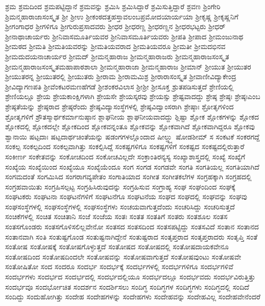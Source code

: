 {ಶ್ರಮ
ಶ್ರಮದಿಂದ
ಶ್ರಮಪಟ್ಟಿದ್ದಾನೆ
ಶ್ರಮವನ್ನು
ಶ್ರಮಿಸಿ
ಶ್ರಮಿಸಿದ್ದಾರೆ
ಶ್ರಮಿಸುತ್ತಿದ್ದಾರೆ
ಶ್ರವಣ
ಶ್ರಿಂಗೇರಿ
ಶ್ರಿಮನ್ಮಹಾರಾಜಾಸಂಸ್ಕೃತ
ಶ್ರೀ
ಶ್ರೀಉ
ಶ್ರೀಕಂಠದತ್ತಹಸ್ತಾವಲಂಬಪ್ರಮೋದಯಾರ್ಯಯಾ
ಶ್ರೀಕೃಷ್ಣ
ಶ್ರೀಕೃಷ್ಣನಿಗೆ
ಶ್ರೀಗಂಗಾಧರ
ಶ್ರೀಗಳಿಗೂ
ಶ್ರೀಗುರುಪ್ರಸಾದವರು
ಶ್ರೀಧರ
ಶ್ರೀಧರಣ್ಣ
ಶ್ರೀಧರಣ್ಣನ
ಶ್ರೀಧರಭಟ್ಟರು
ಶ್ರೀಧರ್
ಶ್ರೀನಾಥಾಚಾರ್ಯರು
ಶ್ರೀನಿವಾಸಮೂರ್ತಿಯವರ
ಶ್ರೀನಿವಾಸಮೂರ್ತಿಯವರು
ಶ್ರೀಪತಿ
ಶ್ರೀಪಾದ
ಶ್ರೀಮಂಜುನಾಥ
ಶ್ರೀಮಠದ
ಶ್ರೀಮತಿ
ಶ್ರೀಮತಿಯವರನ್ನು
ಶ್ರೀಮತಿಯವರಾದ
ಶ್ರೀಮತಿಯವರೂ
ಶ್ರೀಮತೀ
ಶ್ರೀಮದಭಿನವ
ಶ್ರೀಮದುದಯನಾಚಾರ್ಯರ
ಶ್ರೀಮದ್
ಶ್ರೀಮನ್ಮಹಾರಾಜ
ಶ್ರೀಮನ್ಮಹಾರಾಜರು
ಶ್ರೀಮನ್ಮಹಾರಾಜಸಂಸ್ಕೃತ
ಶ್ರೀಮನ್ಮಹಾರಾಜಸಂಸ್ಕೃತಮಹಾಪಾಠಶಾಲಾ
ಶ್ರೀಮನ್ಮಹಾರಾಜಾ
ಶ್ರೀಮನ್ಮಹಾರಾಜ
ಶ್ರೀಮಾನ್
ಶ್ರೀಯುತ
ಶ್ರೀಯುತರ
ಶ್ರೀಯುತರನ್ನ
ಶ್ರೀಯುತರಲ್ಲಿ
ಶ್ರೀಯುತರು
ಶ್ರೀರಾಮ
ಶ್ರೀರಾಮಮಿಶ್ರ
ಶ್ರೀರಾರಾಸಂಸ್ಕೃತ
ಶ್ರೀವಾಣೀವಿದ್ಯಾಕೇಂದ್ರ
ಶ್ರೀವಿದ್ಯಾಗಣಪತಿ
ಶ್ರೀವೆಂಕಟರಮಣಹೆಗಡೆ
ಶ್ರೀಶಂಕರವಿಲಾಸ
ಶ್ರೀಶ್ರೀ
ಶ್ರೀಸೂಕ್ತ
ಶ್ರುತಪಡಿಸುತ್ತದೆ
ಶ್ರೇಣಿಯಲ್ಲಿ
ಶ್ರೇಣಿಯಲ್ಲೂ
ಶ್ರೇಯ
ಶ್ರೇಯಕಾಂಕ್ಷಿಗಳಾಗಿ
ಶ್ರೇಯಸೇ
ಶ್ರೇಯಸ್ಕರವು
ಶ್ರೇಯಸ್ಸು
ಶ್ರೇಷ್ಟವಾದದ್ದು
ಶ್ರೇಷ್ಠ
ಶ್ರೇಷ್ಠಃ
ಶ್ರೇಷ್ಠಃಎಂಬ
ಶ್ರೇಷ್ಠತೆಯನ್ನು
ಶ್ರೇಷ್ಠರಾದ
ಶ್ರೇಷ್ಠರೆಂದು
ಶ್ರೇಷ್ಠವಿದ್ಯಾಸಂಸ್ಥೆಗಳಲ್ಲಿ
ಶ್ರೇಷ್ಠವಿದ್ವಾಂಸರಾಗಿ
ಶ್ರೇಷ್ಠಾಃ
ಶ್ರೋತೃಗಳಿಂದ
ಶ್ರೋತೃಗಳಿಗೆ
ಶ್ರೌತಸ್ಮಾರ್ಥಕರ್ಮಾನುಷ್ಠಾನ
ಶ್ಲಾಘನೀಯ
ಶ್ಲಾಘನೀಯವಾದದ್ದು
ಶ್ಲಿಷ್ಟಾ
ಶ್ಲೋಕ
ಶ್ಲೋಕಗಳನ್ನು
ಶ್ಲೋಕದ
ಶ್ಲೋಕದಲ್ಲಿ
ಶ್ಲೋಕದಲ್ಲೇ
ಶ್ಲೋಕದಿಂದ
ಶ್ಲೋಕವನ್ನಂತೂ
ಶ್ಲೋಕವನ್ನು
ಶ್ಲೋಕವಾಗಿದೆ
ಶ್ಲೋಕವಾಗಿದ್ದರೂ
ಶ್ಲೋಕವು
ಶ್ವಾನಾಯಿ
ಷಟ್ಪದಾಃ
ಷಟ್ಪದಾರ್ಥಚಿಂತೆಯನ್ನು
ಷಡಂಗಗಳಲ್ಲೊಂದಾದ
ಷೀಲ್ಡ್ನ್ನು
ಷೋಡಶೀಮ್
ಸ
ಸಂಕಟಕೆ
ಸಂಕರಗದ್ದೆ
ಸಂಕಲ್ಪ
ಸಂಕಲ್ಪದಿಂದ
ಸಂಕಲ್ಪವಾಗಿತ್ತು
ಸಂಕಲ್ಪಿಸಿದ್ದೆ
ಸಂಕಷ್ಟಗಳಿಗೂ
ಸಂಕಷ್ಟಗಳಿಗೆ
ಸಂಕಷ್ಟದ
ಸಂಕಷ್ಟದಲ್ಲಿರುತ್ತಾರೆ
ಸಂಕೀರ್ಣ
ಸಂಕೇತವನ್ನು
ಸಂಕೋಚದಿಂದ
ಸಂಕೋಚವಿಲ್ಲದೇ
ಸಂಕ್ರಾಂತಿರನ್ಯಸ್ಯ
ಸಂಖ್ಯಾಶಾಸ್ತ್ರದಲ್ಲಿ
ಸಂಖ್ಯೆ
ಸಂಖ್ಯೆಗೆ
ಸಂಖ್ಯೆಯ
ಸಂಖ್ಯೆಯಿಂದ
ಸಂಖ್ಯೆಯೂ
ಸಂಖ್ಯೆಯೆಂದೂ
ಸಂಗ
ಸಂಗಡ
ಸಂಗಡವೇ
ಸಂಗತಿ
ಸಂಗತಿಯಲ್ಲ
ಸಂಗತಿಯಾಗಿದೆ
ಸಂಗಮದಂತೆ
ಸಂಗಮಿಸಿದ
ಸಂಗರಾಗವ್ಯಪೇತಂ
ಸಂಗಾತಿಯಾದ
ಸಂಗೀತ
ಸಂಗೀತಕಲೆಗಳ
ಸಂಗ್ರಹಕ್ಕಾಗಿ
ಸಂಗ್ರಹದಲ್ಲಿ
ಸಂಗ್ರಹವಾಯಿತು
ಸಂಗ್ರಹಿಸಲ್ಪಟ್ಟ
ಸಂಗ್ರಹಿಸಿರುವುದನ್ನು
ಸಂಗ್ರಹಿಸುವ
ಸಂಗ್ರಾಹ್ಯ
ಸಂಘ
ಸಂಘಂದಿಂದ
ಸಂಘಕ್ಕೆ
ಸಂಘಟಕರು
ಸಂಘಟನಾ
ಸಂಘಟನೆಗಳಿಗೆ
ಸಂಘಟನೆಗೂ
ಸಂಘಟನೆಯ
ಸಂಘದ
ಸಂಘದಲ್ಲಿ
ಸಂಘವನ್ನು
ಸಂಘವು
ಸಂಘಸಂಸ್ಥೆಗಳಲ್ಲಿ
ಸಂಘಸಂಸ್ಥೆಗಳಲ್ಲಿ
ಸಂಘಸಂಸ್ಥೆಗಳು
ಸಂಚಯವಾಗುತ್ತದೆಂದು
ಸಂಚರಿಸಿದ್ದು
ಸಂಚರಿಸುತ್ತದೆ
ಸಂಚಿಕೆಗಳಲ್ಲಿ
ಸಂಚಿತ
ಸಂಚಿತಾನಿ
ಸಂಜೆ
ಸಂಜೆಯ
ಸಂತಃ
ಸಂತತ
ಸಂತತಿಗೆ
ಸಂತರು
ಸಂತಶೂಲ
ಸಂತಸ
ಸಂತಸಗೊಂಡರು
ಸಂತಸಗೊಳಿಸಲಿಲ್ಲವೇನೋ
ಸಂತಸದ
ಸಂತಸದಿಂದ
ಸಂತಸಪಟ್ಟಿದ್ದು
ಸಂತಸವಿದೆ
ಸಂತಾನ
ಸಂತಾನದ
ಸಂತಾನವಾಗಿ
ಸಂತಿ
ಸಂತುಷ್ಟಗೊಂಡ
ಸಂತುಷ್ಟನಾಗಿದ್ದೇನೆ
ಸಂತುಷ್ಟರಾದ
ಸಂತೃಪ್ತರಾದ
ಸಂತೃಪ್ತರಾದರು
ಸಂತೃಪ್ತಿ
ಸಂತೆ
ಸಂತೋಷ
ಸಂತೋಷಕ್ಕೆ
ಸಂತೋಷಗೊಳ್ಳುತ್ತದೆ
ಸಂತೋಷದ
ಸಂತೋಷದಲ್ಲಿ
ಸಂತೋಷದಾಯಕವೇನೂ
ಸಂತೋಷದಿಂದ
ಸಂತೋಷದಿಂದಲೇ
ಸಂತೋಷವನ್ನು
ಸಂತೋಷವಾಗುತ್ತದೆ
ಸಂತೋಷವುಂಟು
ಸಂತೋಷವೇ
ಸಂತೋಷಿತೋ
ಸಂದ
ಸಂದರೂ
ಸಂದರ್ಭ
ಸಂದರ್ಭಕ್ಕೆ
ಸಂದರ್ಭಗಳಲ್ಲಿ
ಸಂದರ್ಭಗಳಿಗೂ
ಸಂದರ್ಭಗಳಿವೆ
ಸಂದರ್ಭಗಳು
ಸಂದರ್ಭದ
ಸಂದರ್ಭದಲ್ಲಿ
ಸಂದರ್ಭದಲ್ಲಿಯೂ
ಸಂದರ್ಭದಲ್ಲೂ
ಸಂದರ್ಭವದು
ಸಂದರ್ಭವಿರುತ್ತಿತ್ತು
ಸಂದರ್ಭವೂ
ಸಂದರ್ಭೋಚಿತ
ಸಂದರ್ಶನ
ಸಂದರ್ಶಿಸಲು
ಸಂದಿಗ್ಧ
ಸಂದಿಗ್ಧಗಳ
ಸಂದಿಗ್ಧಗಳು
ಸಂದಿಗ್ಧದಲ್ಲಿ
ಸಂದಿದೆ
ಸಂದಿದ್ದು
ಸಂದುಹೋಗಿತ್ತು
ಸಂದೇಹ
ಸಂದೇಹಗಳನ್ನು
ಸಂದೇಹಗಳು
ಸಂದೇಹವನ್ನು
ಸಂದೇಹವಿಲ್ಲ
ಸಂದೇಹವೇನೆಂದರೆ
}
